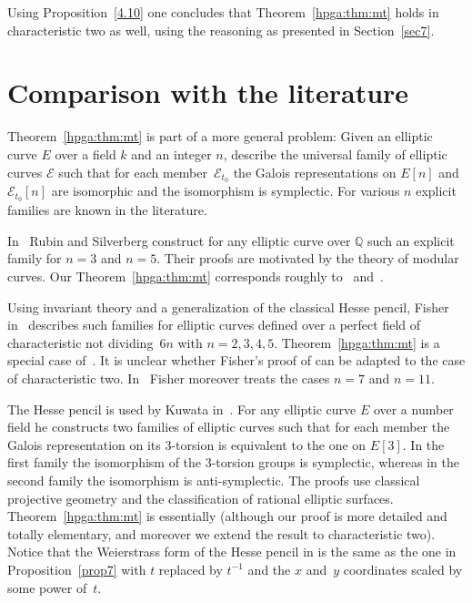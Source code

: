 \documentclass[pdftex]{sigma}
\newcommand{\mqq}{{\mathbb{Q}}}
\newcommand{\msets}[1]{{\left[{#1}\right]}}					%
\numberwithin{equation}{section}
\begin{document}
Using Proposition~\ref{4.10} one concludes that Theorem~\ref{hpga:thm:mt} holds in characteristic two as well, using the reasoning as presented in Section~\ref{sec7}.

\section{Comparison with the literature}\label{hpga:sec:cwer}

Theorem~\ref{hpga:thm:mt} is part of a more general problem: Given an elliptic curve $E$ over a field $k$ and an integer $n$, describe the universal family of elliptic curves $\mathcal{E}$ such that for each member~$\mathcal{E}_{t_0}$ the Galois representations on $E\msets{n}$ and $\mathcal{E}_{t_0}\msets{n}$ are isomorphic and the isomorphism is symplectic. For various $n$ explicit families are known in the literature.

In~\cite{rubin1993} Rubin and Silverberg construct for any elliptic curve over $\mqq$ such an explicit family for $n=3$ and $n=5$. Their proofs are motivated by the theory of modular curves. Our Theorem~\ref{hpga:thm:mt} corresponds roughly to~\cite[Theorem~4.1]{rubin1993} and~\cite[Remark~4.2]{rubin1993}.

Using invariant theory and a generalization of the classical Hesse pencil, Fisher in~\cite{fisher2012} describes such families for elliptic curves defined over a perfect field of characteristic not dividing~$6n$ with $n=2,3,4,5$. Theorem~\ref{hpga:thm:mt} is a special case of~\cite[Theorem~13.2]{fisher2012}. It is unclear whether Fisher's proof of \cite[Theorem~13.2]{fisher2012} can be adapted to the case of characteristic two. In~\cite{Fisher14} Fisher moreover treats the cases $n=7$ and $n=11$.

The Hesse pencil is used by Kuwata in~\cite{kuwata2012}. For any elliptic curve $E$ over a number field he constructs two families of elliptic curves such that for each member the Galois representation on its 3-torsion is equivalent to the one on $E\msets{3}$. In the first family the isomorphism of the 3-torsion groups is symplectic, whereas in the second family the isomorphism is anti-symplectic. The proofs use classical projective geometry and the classification of rational elliptic surfaces. Theorem~\ref{hpga:thm:mt} is essentially \cite[Theorem~4.2]{kuwata2012} (although our proof is more detailed and totally elementary, and moreover we extend the result to characteristic two). Notice that the Weierstrass form of the Hesse pencil in \cite[Remark~4.4]{kuwata2012} is the same as the one in Proposition~\ref{prop7} with $t$ replaced by $t^{-1}$ and the $x$ and~$y$ coordinates scaled by some power of~$t$.
\end{document}
